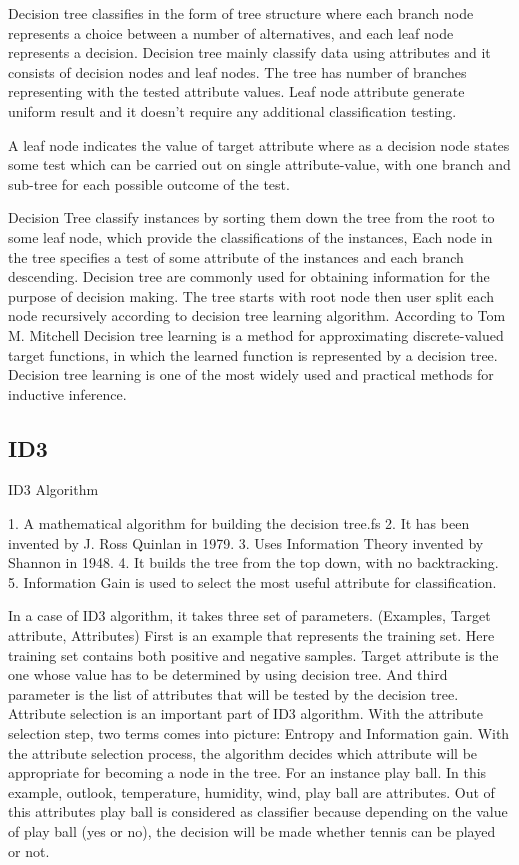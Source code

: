 \documentclass{article}
\begin{document}
Decision tree classifies in the form of tree structure where each branch node represents a choice between a number of alternatives, and each leaf node represents a decision. Decision tree mainly classify data using attributes and it consists of decision nodes and leaf nodes. The tree has number of branches representing with the tested attribute values.
Leaf node attribute generate uniform result and it doesn't require any additional classification testing.	

A leaf node indicates the value of target attribute where as a decision node states some test which can be carried out on single attribute-value, with one branch and sub-tree for each possible outcome of the test.

Decision Tree classify instances by sorting them down the tree from the root to some leaf node, which provide the classifications of the instances, Each node in the tree specifies a test of some attribute of the instances and each branch descending.
Decision tree are commonly used for obtaining information for the purpose of decision making. The tree starts with root node then user split each node recursively according to decision tree learning algorithm.
According to Tom M. Mitchell Decision tree learning is a method for approximating discrete-valued target functions, in which the learned function is represented by a decision tree. Decision tree learning is one of the most widely used and practical methods for inductive inference.

\subsection{ID3}
\label{sec:ID3}

ID3 Algorithm

1. A mathematical algorithm for building the decision tree.fs
2. It has been invented by J. Ross Quinlan in 1979.
3. Uses Information Theory invented by Shannon in 1948.
4. It builds the tree from the top down, with no backtracking.
5. Information Gain is used to select the most useful attribute for classification.

In a case of ID3 algorithm, it takes three set of parameters.
(Examples, Target attribute, Attributes)
First is an example that represents the training set. Here training set contains both positive and negative samples. Target attribute is the one whose value has to be determined by using decision tree. And third parameter is the list of attributes that will be tested by the decision tree. Attribute selection is an important part of ID3 algorithm. With the attribute selection step, two terms comes into picture: Entropy and Information gain. With the attribute selection process, the algorithm decides which attribute will be appropriate for becoming a node in the tree. 
For an instance play ball. In this example, outlook, temperature, humidity, wind, play ball are attributes. Out of this attributes play ball is considered as classifier because depending on the value of play ball (yes or no), the decision will be made whether tennis can be played or not.    
\end{document}
